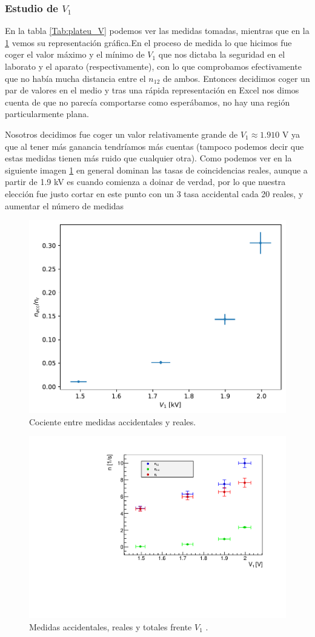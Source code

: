 \documentclass[11pt]{article}
\begin{document}
\subsubsection{Estudio de $V_1$}

En la tabla \ref{Tab:plateu_V} podemos ver las medidas tomadas, mientras que en la \cref{Fig:plateuV} vemos su representación gráfica.En el proceso de medida lo que hicimos fue coger el valor máximo  y el mínimo de $V_1$ que nos dictaba la seguridad en el laborato y el aparato (respectivamente), con lo que comprobamos efectivamente que no había mucha distancia entre el $n_{12}$ de ambos. Entonces decidimos coger un par de valores en el medio y tras una rápida representación en Excel nos dimos cuenta de que no parecía comportarse como esperábamos, no hay una región particularmente plana. 

Nosotros decidimos fue coger un valor relativamente grande de $V_1\approx 1.910$ V ya que al tener más ganancia tendríamos más cuentas (tampoco podemos decir que estas medidas tienen más ruido que cualquier otra). Como podemos ver en la siguiente imagen \ref{Fig:plateuV} en general dominan las tasas de coincidencias reales, aunque a partir de 1.9 kV es cuando comienza a doinar de verdad, por lo que nuestra elección fue justo cortar en este punto con un 3 tasa accidental cada 20 reales, y aumentar el número de medidas

\begin{figure}[h!]
	\centering
	\caption{Cociente entre medidas accidentales y reales.}		\label{Fig:plateuV}
	\includegraphics[width=0.6\linewidth]{../Graficas/GraficoV2.pdf}
\end{figure}



\begin{figure}[h!] \centering
	\caption{Medidas accidentales, reales y totales frente $V_1$ \cite{Root}.}	\label{Fig:plateuV2}
	\includegraphics[width=0.6\linewidth]{../Graficas/GraficoV.pdf}
\end{figure}
\end{document}
